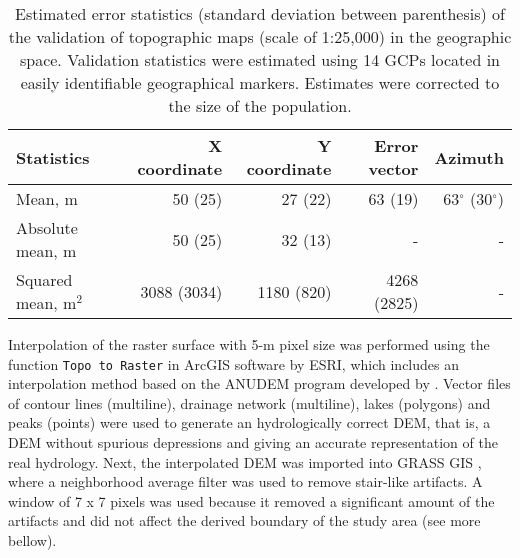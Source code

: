 \begin{table}[ht]
  \caption{Estimated error statistics (standard deviation between parenthesis) of the validation of topographic maps (scale of 1:25,000) in the geographic space. Validation statistics were estimated using 14 GCPs located in easily identifiable geographical markers. Estimates were corrected to the size of the population.}
  \label{tab:topomap-geo-val}
  \centering
  {\small
  \begin{tabular}{lrrrr}
    \hline
    Statistics          & X coordinate & Y coordinate & Error vector & Azimuth                 \\
    \hline
    Mean, m             & 50   (25)    & 27   (22)    & 63   (19)    & 63$^\circ$ (30$^\circ$) \\ 
    Absolute mean, m    & 50   (25)    & 32   (13)    & -            & -                       \\ 
    Squared mean, m$^2$ & 3088 (3034)  & 1180 (820)   & 4268 (2825)  & -                       \\ 
    \hline
  \end{tabular}}
\end{table}


Interpolation of the raster surface with 5-m pixel size was performed using the function \texttt{Topo to Raster} in ArcGIS\textregistered{} software by ESRI, which includes an interpolation method based on the ANUDEM program developed by \cite{Hutchinson1989}. Vector files of contour lines (multiline), drainage network (multiline), lakes (polygons) and peaks (points) were used to generate an hydrologically correct DEM, that is, a DEM without spurious depressions and giving an accurate representation of the real hydrology. Next, the interpolated DEM was imported into GRASS GIS \cite{GRASS2012}, where a neighborhood average filter was used to remove stair-like artifacts. A window of 7 x 7 pixels was used because it removed a significant amount of the artifacts and did not affect the derived boundary of the study area (see more bellow).

